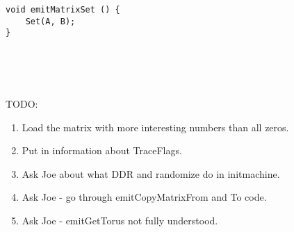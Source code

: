 \documentclass[10pt]{article}
\begin{document}
    \begin{verbatim}
void emitMatrixSet () {
    Set(A, B);
}
\end{verbatim}

    \inputminted{c}{mm-emitGetTorus.c}
    \inputminted{c}{mm-emitMatrixMul.c}
\inputminted{c}{mm-check.c}
\inputminted{c}{mm-tests.c}
\inputminted{c}{mm-main.c}

    TODO: \begin{enumerate}
    \item Load the matrix with more interesting numbers than all zeros.
    \item Put in information about TraceFlags.
    \item Ask Joe about what DDR and randomize do in initmachine.
    \item Ask Joe - go through emitCopyMatrixFrom and To code.
    \item Ask Joe - emitGetTorus not fully understood.
    \end{enumerate}
\end{document}
